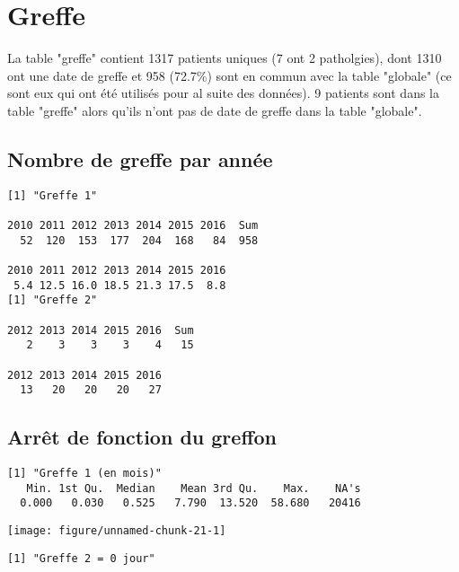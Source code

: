 \documentclass[11pt,a4paper]{article}\usepackage[]{graphicx}\usepackage[]{color}
\makeatletter
\def\maxwidth{ %
  \ifdim\Gin@nat@width>\linewidth
    \linewidth
  \else
    \Gin@nat@width
  \fi
}
\newenvironment{kframe}{%
 \def\at@end@of@kframe{}%
 \ifinner\ifhmode%
  \def\at@end@of@kframe{\end{minipage}}%
  \begin{minipage}{\columnwidth}%
 \fi\fi%
 \def\FrameCommand##1{\hskip\@totalleftmargin \hskip-\fboxsep
 \colorbox{shadecolor}{##1}\hskip-\fboxsep
     \hskip-\linewidth \hskip-\@totalleftmargin \hskip\columnwidth}%
 \MakeFramed {\advance\hsize-\width
   \@totalleftmargin\z@ \linewidth\hsize
   \@setminipage}}%
 {\par\unskip\endMakeFramed%
 \at@end@of@kframe}
\newenvironment{knitrout}{}{} %
\makeatother
\begin{document}
\section{Greffe}

La table "greffe" contient 1317 patients uniques (7 ont 2 patholgies), dont 1310 ont une date de greffe et 958 (72.7\%) sont en commun avec la table "globale" (ce sont eux qui ont été utilisés pour al suite des données). 9 patients sont dans la table "greffe" alors qu'ils n'ont pas de date de greffe dans la table "globale".

  \subsection{Nombre de greffe par année}

\begin{knitrout}
\color{fgcolor}\begin{kframe}
\begin{verbatim}
[1] "Greffe 1"

2010 2011 2012 2013 2014 2015 2016  Sum 
  52  120  153  177  204  168   84  958 

2010 2011 2012 2013 2014 2015 2016 
 5.4 12.5 16.0 18.5 21.3 17.5  8.8 
[1] "Greffe 2"

2012 2013 2014 2015 2016  Sum 
   2    3    3    3    4   15 

2012 2013 2014 2015 2016 
  13   20   20   20   27 
\end{verbatim}
\end{kframe}
\end{knitrout}


  \subsection{Arrêt de fonction du greffon}
  
\begin{knitrout}
\color{fgcolor}\begin{kframe}
\begin{verbatim}
[1] "Greffe 1 (en mois)"
   Min. 1st Qu.  Median    Mean 3rd Qu.    Max.    NA's 
  0.000   0.030   0.525   7.790  13.520  58.680   20416 
\end{verbatim}
\end{kframe}
\texttt{[image: figure/unnamed-chunk-21-1]} 
\begin{kframe}\begin{verbatim}
[1] "Greffe 2 = 0 jour"
\end{verbatim}
\end{kframe}
\end{knitrout}
\end{document}
